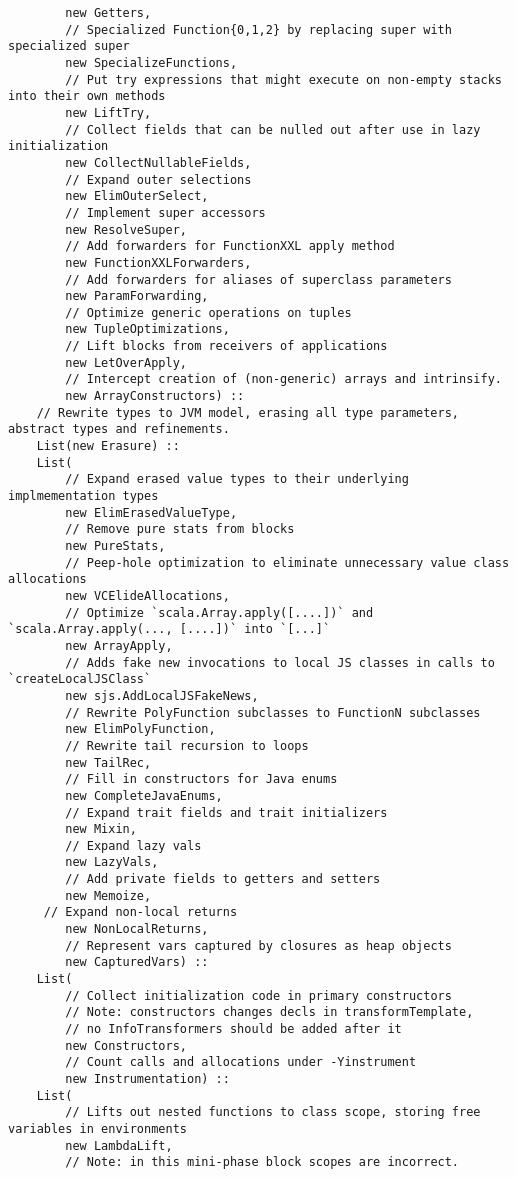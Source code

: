 \documentclass[letterpaper,12pt,titlepage,oneside,final]{book}
\begin{document}
\begin{verbatim}
		new Getters,
		// Specialized Function{0,1,2} by replacing super with specialized super                
		new SpecializeFunctions,  
		// Put try expressions that might execute on non-empty stacks into their own methods  
		new LiftTry, 
		// Collect fields that can be nulled out after use in lazy initialization               
		new CollectNullableFields,  
		// Expand outer selections
		new ElimOuterSelect,
		// Implement super accessors        
		new ResolveSuper,           
		// Add forwarders for FunctionXXL apply method
		new FunctionXXLForwarders,  
		// Add forwarders for aliases of superclass parameters
		new ParamForwarding,     
		// Optimize generic operations on tuples   
		new TupleOptimizations,   
		// Lift blocks from receivers of applications  
		new LetOverApply, 
		// Intercept creation of (non-generic) arrays and intrinsify.          
		new ArrayConstructors) ::  
	// Rewrite types to JVM model, erasing all type parameters, abstract types and refinements.	 
	List(new Erasure) ::            
	List(
		// Expand erased value types to their underlying implmementation types
		new ElimErasedValueType,    
		// Remove pure stats from blocks
		new PureStats,        
		// Peep-hole optimization to eliminate unnecessary value class allocations      
		new VCElideAllocations,   
		// Optimize `scala.Array.apply([....])` and `scala.Array.apply(..., [....])` into `[...]`  
		new ArrayApply,     
		// Adds fake new invocations to local JS classes in calls to `createLocalJSClass`        
		new sjs.AddLocalJSFakeNews, 
	 	// Rewrite PolyFunction subclasses to FunctionN subclasses
		new ElimPolyFunction,     
	 	// Rewrite tail recursion to loops 
		new TailRec,               
		// Fill in constructors for Java enums
		new CompleteJavaEnums,    
		// Expand trait fields and trait initializers  
		new Mixin,                  
		// Expand lazy vals
		new LazyVals,              
		// Add private fields to getters and setters
		new Memoize,                
	 // Expand non-local returns
		new NonLocalReturns,       
		// Represent vars captured by closures as heap objects
		new CapturedVars) ::        
	List(
		// Collect initialization code in primary constructors
		// Note: constructors changes decls in transformTemplate, 
		// no InfoTransformers should be added after it
		new Constructors,           
		// Count calls and allocations under -Yinstrument
		new Instrumentation) ::     
	List(
		// Lifts out nested functions to class scope, storing free variables in environments
		new LambdaLift,             
		// Note: in this mini-phase block scopes are incorrect. 

\end{verbatim}
\end{document}
